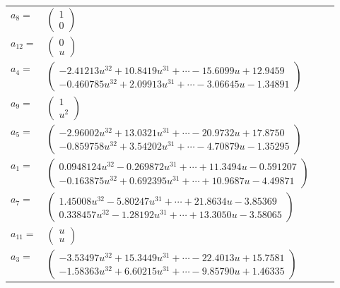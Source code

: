 \documentclass[1p]{elsarticle_modified}
\theoremstyle{definition}
\begin{document}
\begin{tabular}{m{7pt} m{180pt} m{7pt} m{180pt} }
\flushright $a_{8}=$&$\begin{pmatrix}1\\0\end{pmatrix}$ \\
\flushright $a_{12}=$&$\begin{pmatrix}0\\u\end{pmatrix}$ \\
\flushright $a_{4}=$&$\begin{pmatrix}-2.41213 u^{32}+10.8419 u^{31}+\cdots-15.6099 u+12.9459\\-0.460785 u^{32}+2.09913 u^{31}+\cdots-3.06645 u-1.34891\end{pmatrix}$ \\
\flushright $a_{9}=$&$\begin{pmatrix}1\\u^2\end{pmatrix}$ \\
\flushright $a_{5}=$&$\begin{pmatrix}-2.96002 u^{32}+13.0321 u^{31}+\cdots-20.9732 u+17.8750\\-0.859758 u^{32}+3.54202 u^{31}+\cdots-4.70879 u-1.35295\end{pmatrix}$ \\
\flushright $a_{1}=$&$\begin{pmatrix}0.0948124 u^{32}-0.269872 u^{31}+\cdots+11.3494 u-0.591207\\-0.163875 u^{32}+0.692395 u^{31}+\cdots+10.9687 u-4.49871\end{pmatrix}$ \\
\flushright $a_{7}=$&$\begin{pmatrix}1.45008 u^{32}-5.80247 u^{31}+\cdots+21.8634 u-3.85369\\0.338457 u^{32}-1.28192 u^{31}+\cdots+13.3050 u-3.58065\end{pmatrix}$ \\
\flushright $a_{11}=$&$\begin{pmatrix}u\\u\end{pmatrix}$ \\
\flushright $a_{3}=$&$\begin{pmatrix}-3.53497 u^{32}+15.3449 u^{31}+\cdots-22.4013 u+15.7581\\-1.58363 u^{32}+6.60215 u^{31}+\cdots-9.85790 u+1.46335\end{pmatrix}$ \\

\end{tabular}
\end{document}
